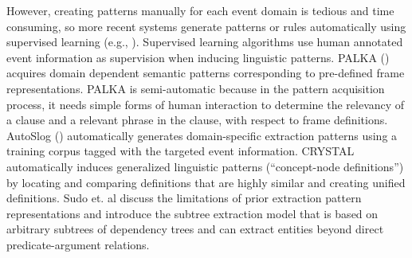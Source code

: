 However, creating patterns manually for each event domain 
is tedious and time consuming, 
so more recent systems generate patterns or rules automatically
using supervised learning (e.g.,
\cite{palka93,autoslog-aaai93,soderland95,huffman96,freitag-acl98,ciravegna01,califf03}).
Supervised learning algorithms use human annotated 
event information 
as supervision when inducing 
linguistic patterns. 
PALKA (\cite{palka93}) 
acquires domain dependent semantic patterns 
corresponding to pre-defined frame representations. 
PALKA is semi-automatic because in the pattern acquisition process, 
it needs simple forms of human interaction to determine the relevancy 
of a clause and 
a relevant phrase in the clause, with respect to 
frame definitions. 
AutoSlog (\cite{autoslog-aaai93}) 
automatically generates domain-specific extraction patterns 
using a training corpus tagged with the targeted event information.   
CRYSTAL \cite{soderland95} 
automatically induces generalized linguistic patterns 
(``concept-node definitions'') 
by locating and comparing definitions that 
are highly similar and creating unified definitions. 
Sudo et. al \cite{sudo03} discuss the limitations of prior 
extraction pattern representations and 
introduce the subtree extraction model that 
is based on arbitrary subtrees of dependency trees 
and can extract entities beyond direct 
predicate-argument relations.


